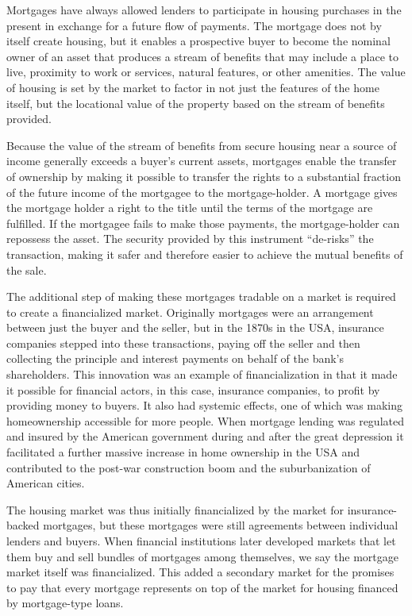 Mortgages have always allowed lenders to participate in housing purchases in the present in exchange for a future flow of payments. The mortgage does not by itself create housing, but it enables a prospective buyer to become the nominal owner of an asset that produces a stream of benefits that may include a place to live, proximity to work or services, natural features, or other amenities. The value of housing is set by the market to factor in not just the features of the home itself, but the locational value of the property based on the stream of benefits provided. 

Because the value of the stream of benefits from secure housing near a source of income generally exceeds a buyer's current assets, mortgages enable the transfer of ownership by making it possible to transfer the rights to a substantial fraction of the future income of the mortgagee to the mortgage-holder. A mortgage gives the mortgage holder a right to the title until the terms of the mortgage are fulfilled.  If the mortgagee fails to make those payments, the mortgage-holder can repossess the asset. The security provided by this instrument ``de-risks'' the transaction, making it safer and therefore easier to achieve the mutual benefits of the sale. 

The additional step of making these mortgages tradable on a market is required to create a financialized market. Originally mortgages were an arrangement between just the buyer and the seller, but in the 1870s in the USA, insurance companies stepped into these transactions, paying off the seller and then collecting the principle and interest payments on behalf of the bank's shareholders. This innovation was an example of financialization in that it made it possible for financial actors, in this case,  insurance companies, to profit by providing money to buyers. It also had systemic effects, one of which was making homeownership accessible for more people. When mortgage lending was regulated and insured  by the American government during and after the great depression it facilitated a further massive increase in home ownership in the USA and contributed to the post-war construction boom and the suburbanization of American cities. 

The housing market was thus initially financialized by the market for insurance-backed mortgages, but these mortgages were still agreements between individual lenders and buyers. When financial institutions later developed markets that let them buy and sell bundles of mortgages among themselves, we say the mortgage market itself was financialized. This added %
a secondary market for the promises to pay that every mortgage represents on top of the market for housing financed by mortgage-type loans.
%

